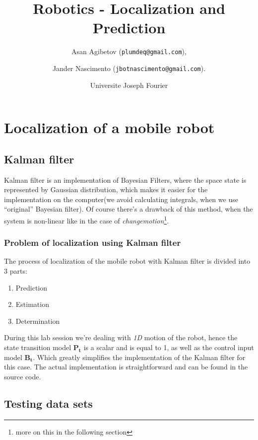 \documentclass{article}
\begin{document}
\title{Robotics - Localization and Prediction}

\author{Asan Agibetov (\texttt{plumdeq@gmail.com}), 
\and Jander Nascimento (\texttt{jbotnascimento@gmail.com}).
\and Universite Joseph Fourier}

\maketitle

\section{Localization of a mobile robot}

\subsection{Kalman filter}
Kalman filter is an implementation of Bayesian Filters, where the space state is represented by Gaussian distribution, which makes it easier for the implementation on the computer(we avoid calculating integrals, when we use ``original'' Bayesian filter). Of course there's a drawback of this method, when the system is non-linear like in the case of \textit{changemotion}\footnote{more on this in the following section}.
\subsubsection{Problem of localization using Kalman filter}
The process of localization of the mobile robot with Kalman filter is divided into 3 parts:

\begin{enumerate}
\item Prediction
\item Estimation
\item Determination
\end{enumerate}

During this lab session we're dealing with \textit{1D} motion of the robot, hence the state transition model $\mathbf{P_t}$ is a scalar and is equal to 1, as well as the control input model $\mathbf{B_t}$. Which greatly simplifies the implementation of the Kalman filter for this case. The actual implementation is straightforward and can be found in the source code.
\subsection{Testing data sets}
\end{document}
